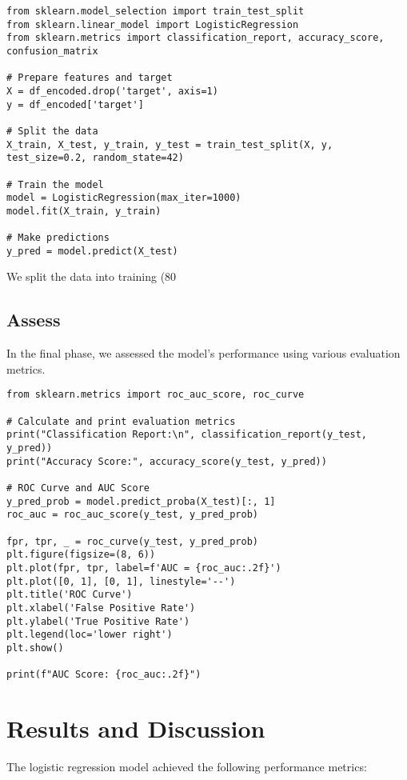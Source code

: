 \documentclass[12pt]{article}
\begin{document}
\begin{verbatim}
from sklearn.model_selection import train_test_split
from sklearn.linear_model import LogisticRegression
from sklearn.metrics import classification_report, accuracy_score, confusion_matrix

# Prepare features and target
X = df_encoded.drop('target', axis=1)
y = df_encoded['target']

# Split the data
X_train, X_test, y_train, y_test = train_test_split(X, y, test_size=0.2, random_state=42)

# Train the model
model = LogisticRegression(max_iter=1000)
model.fit(X_train, y_train)

# Make predictions
y_pred = model.predict(X_test)
\end{verbatim}

We split the data into training (80%

\subsection{Assess}
In the final phase, we assessed the model's performance using various evaluation metrics.

\begin{verbatim}
from sklearn.metrics import roc_auc_score, roc_curve

# Calculate and print evaluation metrics
print("Classification Report:\n", classification_report(y_test, y_pred))
print("Accuracy Score:", accuracy_score(y_test, y_pred))

# ROC Curve and AUC Score
y_pred_prob = model.predict_proba(X_test)[:, 1]
roc_auc = roc_auc_score(y_test, y_pred_prob)

fpr, tpr, _ = roc_curve(y_test, y_pred_prob)
plt.figure(figsize=(8, 6))
plt.plot(fpr, tpr, label=f'AUC = {roc_auc:.2f}')
plt.plot([0, 1], [0, 1], linestyle='--')
plt.title('ROC Curve')
plt.xlabel('False Positive Rate')
plt.ylabel('True Positive Rate')
plt.legend(loc='lower right')
plt.show()

print(f"AUC Score: {roc_auc:.2f}")
\end{verbatim}

\section{Results and Discussion}
The logistic regression model achieved the following performance metrics:
\end{document}
